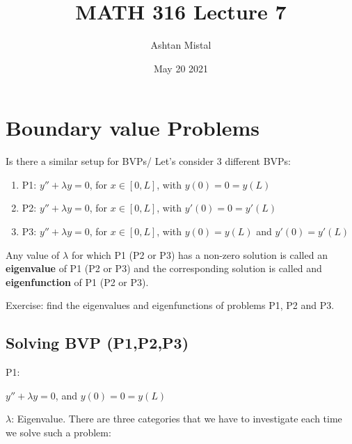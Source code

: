 \documentclass{article}
\title{MATH 316 Lecture 7}
\author{Ashtan Mistal}
\date{May 20 2021}
\begin{document}
\ifstandalone
\maketitle
\fi

\graphicspath{{./Lecture07/}}

\section{Boundary value Problems}

Is there a similar setup for BVPs/ Let's consider 3 different BVPs:
\begin{enumerate}
    \item P1: $y'' + \lambda y = 0$, for $x \in [0,L]$, with $y(0) = 0 = y(L)$
    \item P2: $y'' + \lambda y = 0$, for $x \in [0,L]$, with $y'(0) = 0 = y'(L)$
    \item P3: $y'' + \lambda y = 0$, for $x \in [0,L]$, with $y(0) = y(L)$ and $y'(0) = y'(L)$
\end{enumerate}

Any value of $\lambda$ for which P1 (P2 or P3) has a non-zero solution is called an \textbf{eigenvalue} of P1 (P2 or P3) and the corresponding solution is called and \textbf{eigenfunction} of P1 (P2 or P3).

Exercise: find the eigenvalues and eigenfunctions of problems P1, P2 and P3. 

\subsection{Solving BVP (P1,P2,P3)}

P1: \begin{center} $y'' + \lambda y = 0$, and $y(0) = 0 = y(L)$ \end{center}

$\lambda$: Eigenvalue. There are three categories that we have to investigate each time we solve such a problem:
\end{document}
